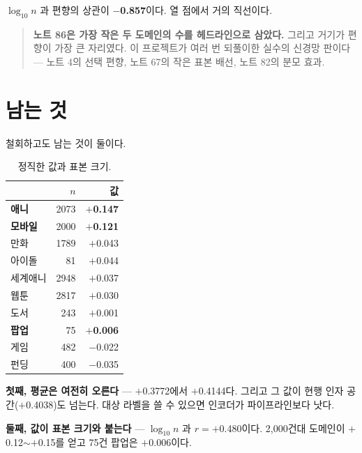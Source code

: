 \documentclass[10pt]{article}
\begin{document}
$\log_{10} n$ 과 편향의 상관이 \textbf{$-$0.857}이다. 열 점에서 거의 직선이다.


\begin{quote}\fontsize{9.5}{11.5}\selectfont
\textbf{노트 86은 가장 작은 두 도메인의 수를 헤드라인으로 삼았다.} 그리고 거기가
편향이 가장 큰 자리였다. 이 프로젝트가 여러 번 되풀이한 실수의 신경망 판이다
--- 노트 4의 선택 편향, 노트 67의 작은 표본 배선, 노트 82의 분모 효과.
\end{quote}

\section{남는 것}

철회하고도 남는 것이 둘이다.

\begin{table}[t]
\centering\tsize
\caption{정직한 값과 표본 크기.}
\begin{tabular}{lrr}
\toprule
& $n$ & 값 \\
\midrule
\textbf{애니} & 2073 & \textbf{$+$0.147} \\
\textbf{모바일} & 2000 & \textbf{$+$0.121} \\
만화 & 1789 & $+$0.043 \\
아이돌 & 81 & $+$0.044 \\
세계애니 & 2948 & $+$0.037 \\
웹툰 & 2817 & $+$0.030 \\
도서 & 243 & $+$0.001 \\
\textbf{팝업} & 75 & \textbf{$+$0.006} \\
게임 & 482 & $-$0.022 \\
펀딩 & 400 & $-$0.035 \\
\bottomrule
\end{tabular}
\end{table}

\textbf{첫째, 평균은 여전히 오른다} --- $+$0.3772에서 $+$0.4144다. 그리고 그
값이 현행 인자 공간($+$0.4038)도 넘는다. 대상 라벨을 쓸 수 있으면 인코더가
파이프라인보다 낫다.

\textbf{둘째, 값이 표본 크기와 붙는다} --- $\log_{10}n$ 과 $r=+$0.480이다.
2,000건대 도메인이 $+$0.12$\sim+$0.15를 얻고 75건 팝업은 $+$0.006이다.
\end{document}
